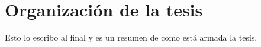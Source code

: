\section{Organización de la tesis}
Esto lo escribo al final y es un resumen de como está armada la tesis.
